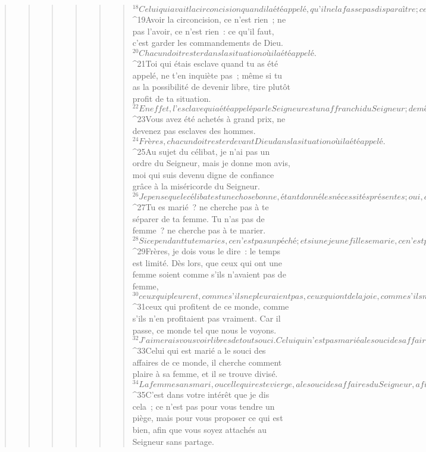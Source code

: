 \begin{verse}
\begin{verse}
\begin{verse}
\begin{verse}
\begin{verse}
\begin{verse}
${}^{18}Celui qui avait la circoncision quand il a été appelé, qu’il ne la fasse pas disparaître ; celui qui n’avait pas la circoncision quand il a été appelé, qu’il ne se fasse pas circoncire. 
${}^{19}Avoir la circoncision, ce n’est rien ; ne pas l’avoir, ce n’est rien : ce qu’il faut, c’est garder les commandements de Dieu. 
${}^{20}Chacun doit rester dans la situation où il a été appelé. 
${}^{21}Toi qui étais esclave quand tu as été appelé, ne t’en inquiète pas ; même si tu as la possibilité de devenir libre, tire plutôt profit de ta situation. 
${}^{22}En effet, l’esclave qui a été appelé par le Seigneur est un affranchi du Seigneur ; de même, l’homme libre qui a été appelé est un esclave du Christ. 
${}^{23}Vous avez été achetés à grand prix, ne devenez pas esclaves des hommes. 
${}^{24}Frères, chacun doit rester devant Dieu dans la situation où il a été appelé.
${}^{25}Au sujet du célibat, je n’ai pas un ordre du Seigneur, mais je donne mon avis, moi qui suis devenu digne de confiance grâce à la miséricorde du Seigneur. 
${}^{26}Je pense que le célibat est une chose bonne, étant donné les nécessités présentes ; oui, c’est une chose bonne de vivre ainsi. 
${}^{27}Tu es marié ? ne cherche pas à te séparer de ta femme. Tu n’as pas de femme ? ne cherche pas à te marier. 
${}^{28}Si cependant tu te maries, ce n’est pas un péché ; et si une jeune fille se marie, ce n’est pas un péché. Mais ceux qui font ce choix y trouveront les épreuves correspondantes, et c’est cela que moi, je voudrais vous éviter. 
${}^{29}Frères, je dois vous le dire : le temps est limité. Dès lors, que ceux qui ont une femme soient comme s’ils n’avaient pas de femme, 
${}^{30}ceux qui pleurent, comme s’ils ne pleuraient pas, ceux qui ont de la joie, comme s’ils n’en avaient pas, ceux qui font des achats, comme s’ils ne possédaient rien, 
${}^{31}ceux qui profitent de ce monde, comme s’ils n’en profitaient pas vraiment. Car il passe, ce monde tel que nous le voyons. 
${}^{32}J’aimerais vous voir libres de tout souci. Celui qui n’est pas marié a le souci des affaires du Seigneur, il cherche comment plaire au Seigneur. 
${}^{33}Celui qui est marié a le souci des affaires de ce monde, il cherche comment plaire à sa femme, et il se trouve divisé. 
${}^{34}La femme sans mari, ou celle qui reste vierge, a le souci des affaires du Seigneur, afin d’être sanctifiée dans son corps et son esprit. Celle qui est mariée a le souci des affaires de ce monde, elle cherche comment plaire à son mari. 
${}^{35}C’est dans votre intérêt que je dis cela ; ce n’est pas pour vous tendre un piège, mais pour vous proposer ce qui est bien, afin que vous soyez attachés au Seigneur sans partage. 

\end{verse}
\end{verse}
\end{verse}
\end{verse}
\end{verse}
\end{verse}
